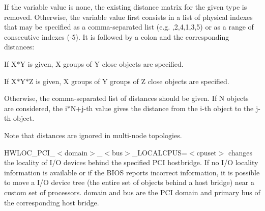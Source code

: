 \begin{DoxyDescription}
If the variable value is {\ttfamily none}, the existing distance matrix for the given type is removed. Otherwise, the variable value first consists in a list of physical indexes that may be specified as a comma-\/separated list (e.g. {,2,4,1,3,5}) or as a range of consecutive indexes ({-\/5}). It is followed by a colon and the corresponding distances: 
\begin{DoxyItemize}
\item If {\ttfamily X$\ast$Y} is given, X groups of Y close objects are specified. 
\item If {\ttfamily X$\ast$Y$\ast$Z} is given, X groups of Y groups of Z close objects are specified. 
\item Otherwise, the comma-\/separated list of distances should be given. If N objects are considered, the i$\ast$N+j-\/th value gives the distance from the i-\/th object to the j-\/th object. 
\end{DoxyItemize}

Note that distances are ignored in multi-\/node topologies. 


\item[HWLOC\_\-PCI\_\-$<$domain$>$\_\-$<$bus$>$\_\-LOCALCPUS=$<$cpuset$>$ ]changes the locality of I/O devices behind the specified PCI hostbridge. If no I/O locality information is available or if the BIOS reports incorrect information, it is possible to move a I/O device tree (the entire set of objects behind a host bridge) near a custom set of processors. {\ttfamily domain} and {\ttfamily bus} are the PCI domain and primary bus of the corresponding host bridge. 


\end{DoxyDescription}